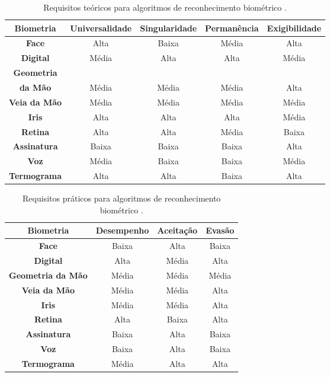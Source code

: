 	\begin{table}[h]
		\begin{center}
			\caption{Requisitos teóricos para algoritmos de reconhecimento biométrico
			\cite{milene}.}
			\label{tab:tabelaRequisitosTeoricos}
			\begin{tabular}{|c|c|c|c|c|}
				\hline \bf Biometria & \bf Universalidade & \bf Singularidade & \bf
				Permanência & \bf Exigibilidade \\ \hline \hline \bf Face & Alta & Baixa & Média & Alta \\
				\hline \bf  Digital & Média & Alta & Alta & Média \\
				\hline \bf Geometria &&&&\\ \bf da Mão & Média & Média & Média & Alta \\
				\hline \bf Veia da Mão & Média & Média & Média & Média \\
				\hline \bf Iris & Alta & Alta & Alta & Média \\
				\hline \bf Retina & Alta & Alta & Média & Baixa \\
				\hline \bf Assinatura & Baixa & Baixa & Baixa & Alta\\
				\hline \bf Voz & Média & Baixa & Baixa & Média \\
				\hline \bf Termograma & Alta & Alta & Baixa & Alta \\
				\hline
			\end{tabular}
		\end{center}
	\end{table}

	\begin{table}[h]
		\begin{center}
			\caption{Requisitos práticos para algoritmos de reconhecimento biométrico
			\cite{milene}.}
			\label{tabelaRequisitosPraticos}
			\begin{tabular}{|c|c|c|c|}
				\hline \bf Biometria & \bf Desempenho & \bf Aceitação & \bf Evasão \\
				\hline \hline \bf Face & Baixa & Alta & Baixa\\
				\hline \bf Digital & Alta & Média &  Alta\\
				\hline \bf Geometria da Mão & Média & Média & Média\\
				\hline \bf Veia da Mão & Média & Média & Alta\\
				\hline \bf Iris  & Média & Média & Alta\\
				\hline \bf Retina & Alta & Baixa & Alta\\
				\hline \bf Assinatura & Baixa & Alta & Baixa \\
				\hline \bf Voz & Baixa & Alta & Baixa \\
				\hline \bf Termograma & Média & Alta & Alta \\
				\hline
			\end{tabular}
		\end{center}
	\end{table}

